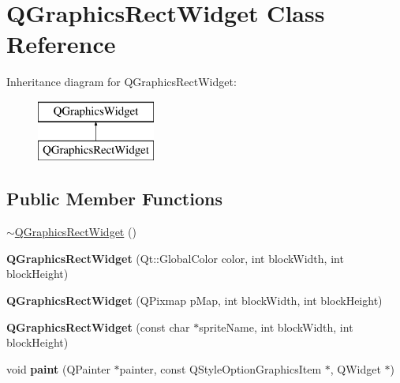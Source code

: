 \hypertarget{class_q_graphics_rect_widget}{\section{Q\-Graphics\-Rect\-Widget Class Reference}
\label{class_q_graphics_rect_widget}
}
Inheritance diagram for Q\-Graphics\-Rect\-Widget\-:\begin{figure}[H]
\begin{center}
\leavevmode
\includegraphics[height=2.000000cm]{class_q_graphics_rect_widget}
\end{center}
\end{figure}
\subsection*{Public Member Functions}
\begin{DoxyCompactItemize}
\item 
\hyperlink{class_q_graphics_rect_widget_ad4eec838ea50678e431d99c554559b00}{$\sim$\-Q\-Graphics\-Rect\-Widget} ()
\item 
\hypertarget{class_q_graphics_rect_widget_a4d6bc01b9a360ff5f8196d1a3469bf0e}{{\bfseries Q\-Graphics\-Rect\-Widget} (Qt\-::\-Global\-Color color, int block\-Width, int block\-Height)}\label{class_q_graphics_rect_widget_a4d6bc01b9a360ff5f8196d1a3469bf0e}

\item 
\hypertarget{class_q_graphics_rect_widget_a6ece45b4d9d1228e752cc33fb114339e}{{\bfseries Q\-Graphics\-Rect\-Widget} (Q\-Pixmap p\-Map, int block\-Width, int block\-Height)}\label{class_q_graphics_rect_widget_a6ece45b4d9d1228e752cc33fb114339e}

\item 
\hypertarget{class_q_graphics_rect_widget_a55d71e9303841da12d016a577efab00f}{{\bfseries Q\-Graphics\-Rect\-Widget} (const char $\ast$sprite\-Name, int block\-Width, int block\-Height)}\label{class_q_graphics_rect_widget_a55d71e9303841da12d016a577efab00f}

\item 
\hypertarget{class_q_graphics_rect_widget_a04a48bc72523408c658e6593ea2b0e0e}{void {\bfseries paint} (Q\-Painter $\ast$painter, const Q\-Style\-Option\-Graphics\-Item $\ast$, Q\-Widget $\ast$)}\label{class_q_graphics_rect_widget_a04a48bc72523408c658e6593ea2b0e0e}

\end{DoxyCompactItemize}

